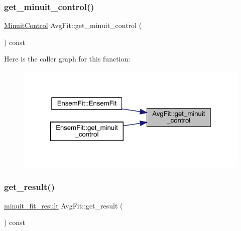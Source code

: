 \mbox{\label{classAvgFit_a2a1fb43d6a70a74e39d7d05de9fe5e5d}} 
\subsubsection{\texorpdfstring{get\_minuit\_control()}{get\_minuit\_control()}\hspace{0.1cm}{\footnotesize\ttfamily [2/2]}}
{\footnotesize\ttfamily \mbox{\hyperlink{structMinuitControl}{Minuit\+Control}} Avg\+Fit\+::get\+\_\+minuit\+\_\+control (\begin{DoxyParamCaption}{ }\end{DoxyParamCaption}) const\hspace{0.3cm}{\ttfamily [inline]}}

Here is the caller graph for this function\+:
\nopagebreak
\begin{figure}[H]
\begin{center}
\leavevmode
\includegraphics[width=322pt]{d4/dfd/classAvgFit_a2a1fb43d6a70a74e39d7d05de9fe5e5d_icgraph}
\end{center}
\end{figure}
\mbox{\label{classAvgFit_a2d288928c4cf2f92ee28fce2503da979}} 
\subsubsection{\texorpdfstring{get\_result()}{get\_result()}\hspace{0.1cm}{\footnotesize\ttfamily [1/2]}}
{\footnotesize\ttfamily \mbox{\hyperlink{structminuit__fit__result}{minuit\+\_\+fit\+\_\+result}} Avg\+Fit\+::get\+\_\+result (\begin{DoxyParamCaption}{ }\end{DoxyParamCaption}) const\hspace{0.3cm}{\ttfamily [inline]}}

